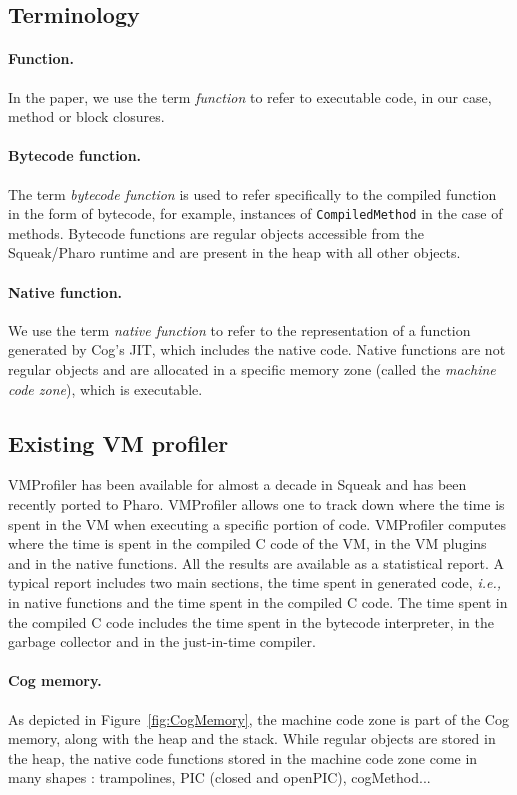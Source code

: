 \documentclass[10pt,preprint,nonatbib]{sigplanconf}
\newcommand{\ct}{\lstinline[backgroundcolor=\color{white},basicstyle=\small\ttfamily]}
\newcommand{\ie}{\emph{i.e.,}\xspace}
\newcommand{\figref}[1]{Figure~\ref{fig:#1}}
\begin{document}
\subsection{Terminology}

\paragraph{Function.} In the paper, we use the term \emph{function} to refer to executable code, in our case, method or block closures.

\paragraph{Bytecode function.} The term \emph{bytecode function} is used to refer specifically to the compiled function in the form of bytecode, for example, instances of \ct{CompiledMethod} in the case of methods. Bytecode functions are regular objects accessible from the Squeak/Pharo runtime and are present in the heap with all other objects.

\paragraph{Native function.} We use the term \emph{native function} to refer to the representation of a function generated by Cog's JIT, which includes the native code. Native functions are not regular objects and are allocated in a specific memory zone (called the \emph{machine code zone}), which is executable.

\subsection{Existing VM profiler}

VMProfiler has been available for almost a decade in Squeak and has been recently ported to Pharo. VMProfiler allows one to track down where the time is spent in the VM when executing a specific portion of code. VMProfiler computes where the time is spent in the compiled C code of the VM, in the VM plugins and in the native functions. All the results are available as a statistical report. A typical report includes two main sections, the time spent in generated code, \ie in native functions and the time spent in the compiled C code. The time spent in the compiled C code includes the time spent in the bytecode interpreter, in the garbage collector and in the just-in-time compiler. 

\paragraph{Cog memory.} As depicted in \figref{CogMemory}, the machine code zone is part of the Cog memory, along with the heap and the stack. While regular objects are stored in the heap, the native code functions stored in the machine code zone come in many shapes : trampolines, PIC (closed and openPIC), cogMethod...
\end{document}
